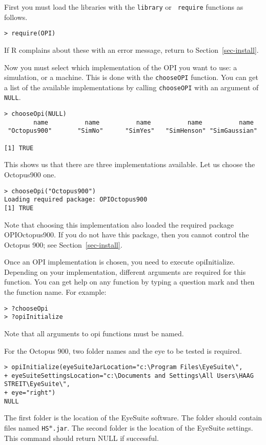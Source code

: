 \documentclass{article}
\begin{document}
First you must load the libraries with the {\tt library} or {\tt
require} functions as follows.

\begin{verbatim}
> require(OPI)
\end{verbatim}

If R complains about these with an error message, return to Section~\ref{sec-install}.

Now you must select which implementation of the OPI you want to
use: a simulation, or a machine. This is done with the {\tt chooseOPI}
function. You can get a list of the available implementations by
calling {\tt chooseOPI} with an argument of {\tt NULL}.

\begin{verbatim}
> chooseOpi(NULL)
        name          name          name          name          name 
 "Octopus900"       "SimNo"      "SimYes"   "SimHenson" "SimGaussian" 

[1] TRUE
\end{verbatim}

This shows us that there are three implementations available. Let us choose
the Octopus900 one.

\begin{verbatim}
> chooseOpi("Octopus900") 
Loading required package: OPIOctopus900 
[1] TRUE
\end{verbatim}

Note that choosing this implementation also loaded the required package
OPIOctopus900. If you do not have this package, then you cannot control the
Octopus 900; see Section~\ref{sec-install}.

Once an OPI implementation is chosen, you need to execute opiInitialize.
Depending on your implementation, different arguments are required for this
function. You can get help on any function by typing a question mark and
then the function name. For example:

\begin{verbatim}
> ?chooseOpi
> ?opiInitialize
\end{verbatim}

Note that all arguments to opi functions must be named.

For the Octopus 900, two folder names and the eye to be tested is required.
\begin{verbatim}
> opiInitialize(eyeSuiteJarLocation="c:\Program Files\EyeSuite\",
+ eyeSuiteSettingsLocation="c:\Documents and Settings\All Users\HAAG STREIT\EyeSuite\",
+ eye="right")
NULL
\end{verbatim}
The first folder is the location of the EyeSuite software. The folder should contain files
named {\tt HS$\ast$.jar}.
The second folder is the location of the EyeSuite settings.
This command should return NULL if successful.
\end{document}
